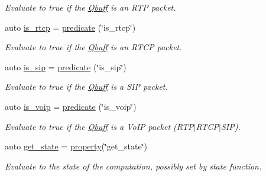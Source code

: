 \begin{DoxyCompactItemize}
\begin{DoxyCompactList}\small\item\em Evaluate to {\ttfamily true} if the \hyperlink{structpfq_1_1lang_1_1Qbuff}{Qbuff} is an R\+TP packet. \end{DoxyCompactList}\item 
auto \hyperlink{namespacepfq_1_1lang_1_1anonymous__namespace_02default_8hpp_03_a2cbe73f955007e35d4a627c2cfb38566}{is\+\_\+rtcp} = \hyperlink{namespacepfq_1_1lang_aca9adafc436b7f851621b979fa1aaf88}{predicate} (\char`\"{}is\+\_\+rtcp\char`\"{})
\begin{DoxyCompactList}\small\item\em Evaluate to {\ttfamily true} if the \hyperlink{structpfq_1_1lang_1_1Qbuff}{Qbuff} is an R\+T\+CP packet. \end{DoxyCompactList}\item 
auto \hyperlink{namespacepfq_1_1lang_1_1anonymous__namespace_02default_8hpp_03_a8be76da99d48c27e0377a7b32e1b5d7d}{is\+\_\+sip} = \hyperlink{namespacepfq_1_1lang_aca9adafc436b7f851621b979fa1aaf88}{predicate} (\char`\"{}is\+\_\+sip\char`\"{})
\begin{DoxyCompactList}\small\item\em Evaluate to {\ttfamily true} if the \hyperlink{structpfq_1_1lang_1_1Qbuff}{Qbuff} is a S\+IP packet. \end{DoxyCompactList}\item 
auto \hyperlink{namespacepfq_1_1lang_1_1anonymous__namespace_02default_8hpp_03_a79aa9beec811d735d03b40f85b4773c5}{is\+\_\+voip} = \hyperlink{namespacepfq_1_1lang_aca9adafc436b7f851621b979fa1aaf88}{predicate} (\char`\"{}is\+\_\+voip\char`\"{})
\begin{DoxyCompactList}\small\item\em Evaluate to {\ttfamily true} if the \hyperlink{structpfq_1_1lang_1_1Qbuff}{Qbuff} is a Vo\+IP packet (R\+T\+P$\vert$\+R\+T\+C\+P$\vert$\+S\+IP). \end{DoxyCompactList}\item 
auto \hyperlink{namespacepfq_1_1lang_1_1anonymous__namespace_02default_8hpp_03_acd2598e95a0ebc3c21e84f9c861d0d98}{get\+\_\+state} = \hyperlink{namespacepfq_1_1lang_a1249450e72229273b0db707a286aea91}{property}(\char`\"{}get\+\_\+state\char`\"{})
\begin{DoxyCompactList}\small\item\em Evaluate to the state of the computation, possibly set by {\ttfamily state} function. \end{DoxyCompactList}\item 

\end{DoxyCompactItemize}

